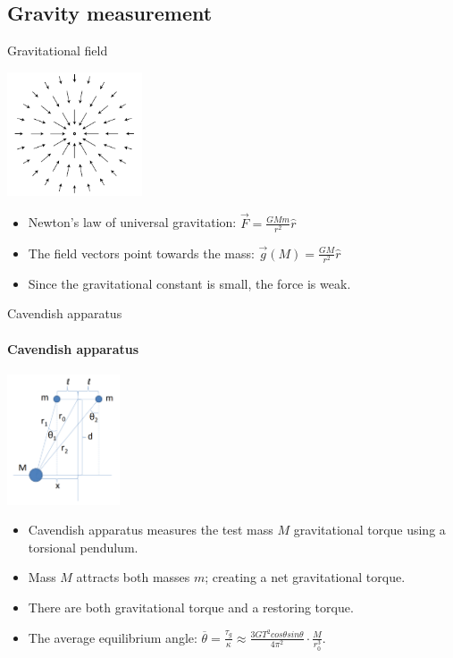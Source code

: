 \documentclass{beamer}
\begin{document}
\subsection{Gravity measurement}
\begin{frame}{Gravitational field}
	\begin{center}		
		\includegraphics[width=0.3\textwidth,keepaspectratio]{gravity.png}
    \end{center}
	\begin{itemize}
		\item Newton's law of universal gravitation: $\overrightarrow{F} = \frac{GMm}{r^2}\hat{r}$
		\item The field vectors point towards the mass: $\overrightarrow{g}(M) = \frac{GM}{r^2}\hat{r}$ 
		\item Since the gravitational constant is small, the force is weak.
		\end{itemize}
\end{frame}
\begin{frame}{Cavendish apparatus}
\framesubtitle{Cavendish apparatus}
	\begin{center}		
		\includegraphics[width=0.25\textwidth,keepaspectratio]{Cavendish apparatus.PNG}
    \end{center}
	\begin{itemize}
		\item Cavendish apparatus measures the test mass $M$ gravitational torque using a torsional pendulum.
		\pause
		\item Mass $M$ attracts both masses $m$; creating a net gravitational torque.
		\item There are both gravitational torque and a restoring torque.
		\pause
		\item The average equilibrium angle: $\overline{\theta} = \frac{\tau_g}{\kappa} \approx \frac{3GT^2cos\theta sin\theta}{4\pi^2 } \cdot \frac{M}{r_0^3}$.

	\end{itemize}
\end{frame}
\end{document}
